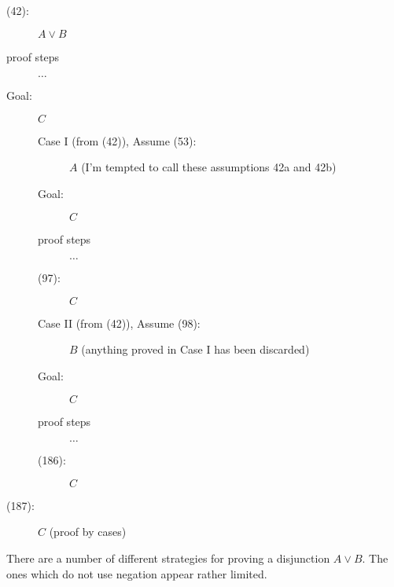 \documentclass[12pt]{article}
\begin{document}
\begin{description}

\item[(42):]  $A \vee B$

\item[proof steps] $\ldots$

\item[Goal:] $C$

\begin{description}

\item[Case I (from (42)), Assume (53):]  $A$  (I'm tempted to call these assumptions 42a and 42b)

\item[Goal:]  $C$

\item [proof steps] $\ldots$

\item[(97):]  $C$



\item[Case II (from (42)), Assume (98):]  $B$ (anything proved in Case I has been discarded)

\item[Goal:]  $C$

\item [proof steps] $\ldots$

\item[(186):]  $C$

\end{description}

\item[(187):]  $C$ (proof by cases)







\end{description}


\newpage

There are a number of different strategies for proving a disjunction $A \vee B$.  The ones which do not use negation appear rather limited.
\end{document}

